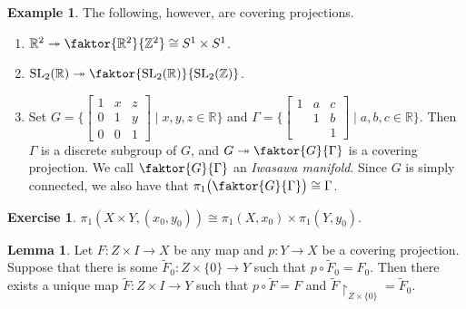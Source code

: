 \documentclass[10pt,letterpaper,cm]{nupset}
\theoremstyle{definition}
\newtheorem{exmp}[definition]{Example}
\theoremstyle{theorem}
\newtheorem{lemma}[definition]{Lemma}
\newtheorem{exercise}[definition]{Exercise}
\theoremstyle{remark}
\newcommand{\R}{\mathbb{R}}
\newcommand{\Z}{\mathbb Z}
\newcommand{\1}{\mathbb{1}}
\newcommand{\0}{\vec 0}
\DeclareMathOperator{\SL}{SL}
\begin{document}
\begin{exmp} The following, however, are covering projections.
\begin{enumerate}
\item $\R^2 \twoheadrightarrow \faktor{\R^2}{\Z^2} \cong S^1 \times S^1$.
\item $\SL_2(\R) \twoheadrightarrow \faktor{\SL_2(\R)}{\SL_2(\Z)}$.
\item Set $G = \big \{ \begin{bmatrix} 1 & x & z \\ 0 & 1 & y \\ 0 & 0 & 1 \end{bmatrix}  \mid x,y,z \in \R \big \}$ and $\Gamma = \big \{ \begin{bmatrix} 1 & a & c \\  & 1 & b \\  &  & 1 \end{bmatrix} \mid a,b,c \in \R \big \}$. Then $\Gamma$ is a discrete subgroup of $G$, and $G \twoheadrightarrow \faktor{G}{\Gamma}$ is a covering projection. We call $\faktor{G}{\Gamma}$ an \textit{Iwasawa manifold}.
Since $G$ is simply connected, we also have that $\pi_1 \big (\faktor{G}{\Gamma} \big) \cong \Gamma$.
\end{enumerate}
\end{exmp}

\begin{exercise}
$\pi_1(X \times Y, (x_0, y_0)) \cong \pi_1(X, x_0) \times \pi_1(Y, y_0)$.
\end{exercise}

\begin{lemma}
Let $F : Z \times I \to X$ be any map and $p: Y \to X$ be a covering projection. Suppose that there is some $\widetilde{F}_0 : Z \times \{0\} \to Y$ such that $p \circ \widetilde{F}_0 = F_0$. Then there exists a unique map $\widetilde{F} : Z \times I \to Y$ such that $p \circ \widetilde{F} = F$ and $\widetilde{F} \restriction_{Z\times \{0\}} = \widetilde{F}_0$.
\end{lemma}
\end{document}

